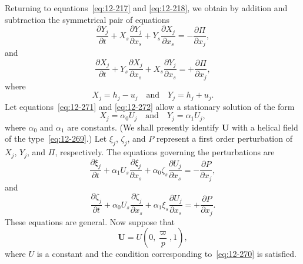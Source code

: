 Returning to equations~\eqref{eq:12-217} and \eqref{eq:12-218}, we obtain by addition and subtraction the symmetrical pair of equations
\begin{equation}
\label{eq:12-271}
\frac{\partial Y_j}{\partial t} + X_s\frac{\partial Y_j}{\partial x_s} + Y_s\frac{\partial X_j}{\partial x_s} = -\frac{\partial\Pi}{\partial x_j},
\end{equation}
and
\begin{equation}
\label{eq:12-272}
\frac{\partial X_j}{\partial t} + Y_s\frac{\partial X_j}{\partial x_s} + X_s\frac{\partial Y_j}{\partial x_s} = +\frac{\partial\Pi}{\partial x_j},
\end{equation}
where
\begin{equation}
\label{eq:12-273}
X_j = h_j - u_j \quad \text{and} \quad Y_j = h_j + u_j.
\end{equation}
Let equations~\eqref{eq:12-271} and \eqref{eq:12-272} allow a stationary solution of the form
\begin{equation}
\label{eq:12-274}
X_j = \alpha_0 U_j \quad \text{and} \quad Y_j = \alpha_1 U_j,
\end{equation}
where $\alpha_0$ and $\alpha_1$ are constants. (We shall presently identify $\mathbf{U}$ with a helical field of the type~\eqref{eq:12-269}.) Let $\xi_j$, $\zeta_j$, and $P$ represent a first order perturbation of $X_j$, $Y_j$, and $\Pi$, respectively. The equations governing the perturbations are
\begin{equation}
\label{eq:12-275}
\frac{\partial \xi_j}{\partial t} + \alpha_1 U_s\frac{\partial \xi_j}{\partial x_s} + \alpha_0 \zeta_s\frac{\partial U_j}{\partial x_s} = -\frac{\partial P}{\partial x_j},
\end{equation}
and
\begin{equation}
\label{eq:12-276}
\frac{\partial \zeta_j}{\partial t} + \alpha_0 U_s\frac{\partial \zeta_j}{\partial x_s} + \alpha_1 \xi_s\frac{\partial U_j}{\partial x_s} = +\frac{\partial P}{\partial x_j}.
\end{equation}
These equations are general. Now suppose that
\begin{equation}
\label{eq:12-277}
\mathbf{U} = U\left(0, \frac{\varpi}{p}, 1\right),
\end{equation}
where $U$ is a constant and the condition corresponding to~\eqref{eq:12-270} is satisfied.

